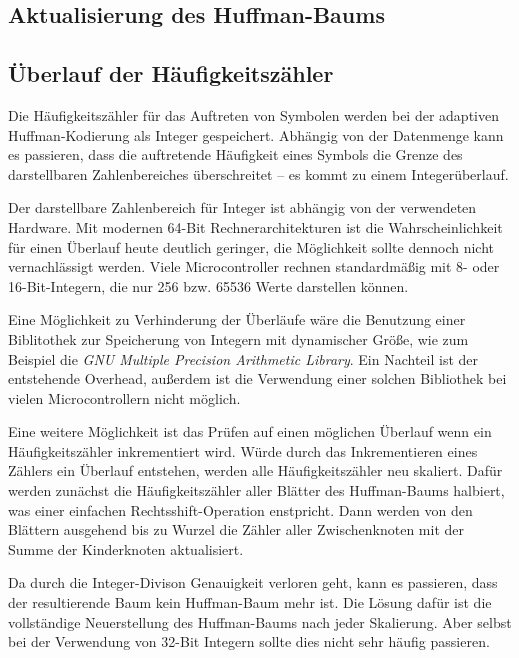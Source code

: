 \documentclass[twoside,11pt,a4paper]{article}
\theoremstyle{break}
\begin{document}
\subsection{Aktualisierung des Huffman-Baums}


\subsection{Überlauf der Häufigkeitszähler}
Die Häufigkeitszähler für das Auftreten von Symbolen werden bei
der adaptiven Huffman-Kodierung als Integer gespeichert. Abhängig von
der Datenmenge kann es passieren, dass die auftretende Häufigkeit
eines Symbols die Grenze des darstellbaren Zahlenbereiches
überschreitet -- es kommt zu einem Integerüberlauf.

Der darstellbare Zahlenbereich für Integer ist abhängig von der
verwendeten Hardware. Mit modernen 64-Bit Rechnerarchitekturen ist die
Wahrscheinlichkeit für einen Überlauf heute deutlich geringer, die
Möglichkeit sollte dennoch nicht vernachlässigt werden. Viele
Microcontroller rechnen standardmäßig mit 8- oder 16-Bit-Integern, die
nur 256 bzw. 65536 Werte darstellen können.

Eine Möglichkeit zu Verhinderung der Überläufe wäre die Benutzung
einer Biblitothek zur Speicherung von Integern mit dynamischer Größe,
wie zum Beispiel die \emph{GNU Multiple Precision Arithmetic
 Library}\cite{GMP}. Ein Nachteil ist der entstehende Overhead,
außerdem ist die Verwendung einer solchen Bibliothek bei vielen
Microcontrollern nicht möglich.

Eine weitere Möglichkeit ist das Prüfen auf einen möglichen Überlauf
wenn ein Häufigkeitszähler inkrementiert wird. Würde durch das
Inkrementieren eines Zählers ein Überlauf entstehen, werden alle
Häufigkeitszähler neu skaliert. Dafür werden zunächst die
Häufigkeitszähler aller Blätter des Huffman-Baums halbiert, was einer
einfachen Rechtsshift-Operation enstpricht. Dann werden von den
Blättern ausgehend bis zu Wurzel die Zähler aller Zwischenknoten mit
der Summe der Kinderknoten aktualisiert.

Da durch die Integer-Divison Genauigkeit verloren geht, kann es
passieren, dass der resultierende Baum kein Huffman-Baum mehr ist. Die
Lösung dafür ist die vollständige Neuerstellung des Huffman-Baums nach
jeder Skalierung. Aber selbst bei der Verwendung von 32-Bit Integern
sollte dies nicht sehr häufig passieren.

\end{document}
